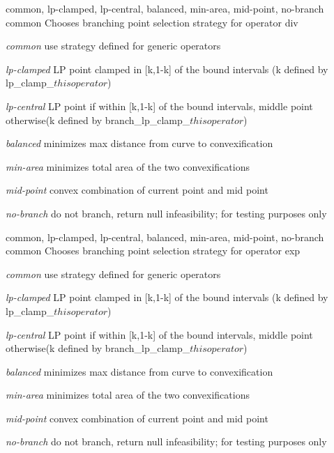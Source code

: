 %
{common, lp-clamped, lp-central, balanced, min-area, mid-point, no-branch}%
{common}%
{Chooses branching point selection strategy for operator div}%
{\begin{list}{}{
\setlength{\parsep}{0em}
\setlength{\leftmargin}{3ex}
\setlength{\labelwidth}{1ex}
\setlength{\itemindent}{0ex}
\setlength{\topsep}{0pt}}
\item[\textit{common}] use strategy defined for generic operators
\item[\textit{lp-clamped}] LP point clamped in [k,1-k] of the bound intervals (k defined by lp\_clamp\_${this operator}$)
\item[\textit{lp-central}] LP point if within [k,1-k] of the bound intervals, middle point otherwise(k defined by branch\_lp\_clamp\_${this operator}$)
\item[\textit{balanced}] minimizes max distance from curve to convexification
\item[\textit{min-area}] minimizes total area of the two convexifications
\item[\textit{mid-point}] convex combination of current point and mid point
\item[\textit{no-branch}] do not branch, return null infeasibility; for testing purposes only
\end{list}
}

%
{common, lp-clamped, lp-central, balanced, min-area, mid-point, no-branch}%
{common}%
{Chooses branching point selection strategy for operator exp}%
{\begin{list}{}{
\setlength{\parsep}{0em}
\setlength{\leftmargin}{3ex}
\setlength{\labelwidth}{1ex}
\setlength{\itemindent}{0ex}
\setlength{\topsep}{0pt}}
\item[\textit{common}] use strategy defined for generic operators
\item[\textit{lp-clamped}] LP point clamped in [k,1-k] of the bound intervals (k defined by lp\_clamp\_${this operator}$)
\item[\textit{lp-central}] LP point if within [k,1-k] of the bound intervals, middle point otherwise(k defined by branch\_lp\_clamp\_${this operator}$)
\item[\textit{balanced}] minimizes max distance from curve to convexification
\item[\textit{min-area}] minimizes total area of the two convexifications
\item[\textit{mid-point}] convex combination of current point and mid point
\item[\textit{no-branch}] do not branch, return null infeasibility; for testing purposes only
\end{list}
}

